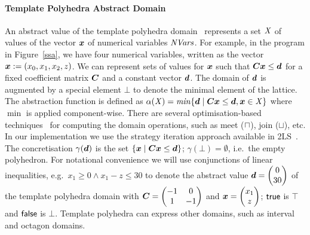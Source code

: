 \paragraph{Template Polyhedra Abstract Domain}
%
An abstract value of the template polyhedra domain~\cite{sriram}
represents a set $\mathit{X}$ of values of the vector ${\boldsymbol {x}}$ of numerical variables $\mathit{NVars}$. For
example, in the program in Figure~\ref{ssa}, we have four numerical
variables, written as the vector ${\boldsymbol {x}}:=(x_0,x_1,x_2,z)$.  We can
represent sets of values for ${\boldsymbol {x}}$ such that
${\boldsymbol C}{\boldsymbol {x}}\leq{\boldsymbol {d}}$ for a fixed coefficient matrix ${\boldsymbol C}$
and a constant vector ${\boldsymbol {d}}$. The domain of ${\boldsymbol {d}}$ is augmented
by a special element $\bot$ to denote the minimal element of the
lattice.
%
The abstraction function is defined as $\alpha(\mathit{X}) = \mathit{min} \{{\boldsymbol {d}}\mid
{\boldsymbol C}{\boldsymbol {x}}\leq{\boldsymbol {d}}, {\boldsymbol {x}}\in \mathit{X}\}$ where $\min$ is applied
component-wise. There are several optimisation-based
techniques~\cite{sriram,GS07b,BJKS15} for computing the domain
operations, such as meet ($\sqcap$), join ($\sqcup$), etc. In our implementation we
use the strategy iteration approach available in 2LS~\cite{BJKS15}.
%
The concretisation $\gamma({\boldsymbol {d}})$ is the set $\{{\boldsymbol {x}}\mid
{\boldsymbol C}{\boldsymbol {x}}\leq{\boldsymbol {d}}\}$; $\gamma(\bot)=\emptyset$, i.e.\ the empty polyhedron.
%
For notational convenience we will use conjunctions of linear
inequalities, e.g.\ $x_1\geq 0 \wedge x_1-z\leq 30$ to denote the
abstract value $\vec{\numabsval}=\vecv{0}{30}$ of the template polyhedra domain
with $\mat{C}=\qmat{-1}{0}{1}{-1}$ and $\vec{\numvar}=\vecv{x_1}{z}$;
$\mathsf{true}$ is $\top$ and $\mathsf{false}$ is $\bot$.  Template polyhedra can
express other domains, such as interval and octagon domains.

